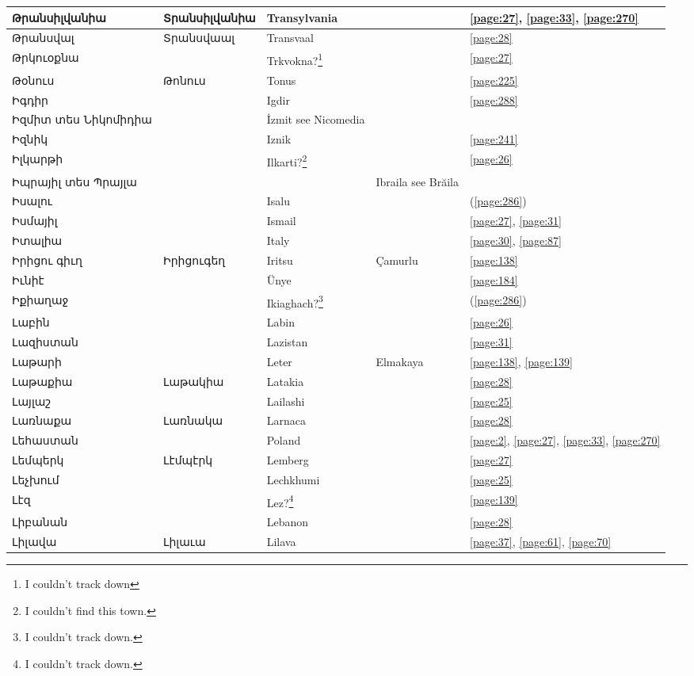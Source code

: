 \begin{center}
\begin{longtable}{|p{}|p{3cm}|p{3cm}|p{2cm}|p{3cm}|}
Թրանսիլվանիա&Տրանսիլվանիա
&Transylvania & &\ref{page:27}, \ref{page:33}, \ref{page:270}\\ \hline
Թրանսվալ&Տրանսվաալ & Transvaal& &\ref{page:28}\\ \hline
Թրկուօքնա& &Trkvokna?\footnote{I couldn't track down}& &\ref{page:27}\\ \hline
Թօնուս& Թոնուս& Tonus& &\ref{page:225}\\ \hline
Իգդիր& & Igdir& &\ref{page:288}\\ \hline
Իզմիտ տես Նիկոմիդիա& &İzmit see Nicomedia & &\\ \hline
Իզնիկ& & Iznik& &\ref{page:241}\\ \hline
Իլկարթի& &Ilkarti?\footnote{I couldn't find this town.} & &\ref{page:26}\\ \hline
Իպրայիլ տես Պրայլա& & &Ibraila see Brăila &\\ \hline
Իսալու& & Isalu& &(\ref{page:286})\\ \hline
Իսմայիլ& & Ismail& &\ref{page:27}, \ref{page:31}\\ \hline
Իտալիա& &Italy & &\ref{page:30}, \ref{page:87}\\ \hline
Իրիցու գիւղ& Իրիցուգեղ&Iritsu &Çamurlu &\ref{page:138}\\ \hline
Իւնիէ& & Ünye& &\ref{page:184}\\ \hline
Իքիաղաջ& &Ikiaghach?\footnote{I couldn't track down.} & &(\ref{page:286})\\ \hline
Լաբին& & Labin& &\ref{page:26}\\ \hline
Լազիստան& &Lazistan & &\ref{page:31}\\ \hline
Լաթարի& & Leter &Elmakaya &\ref{page:138}, \ref{page:139}\\ \hline
Լաթաքիա&   Լաթակիա & Latakia& &\ref{page:28}\\ \hline
Լայլաշ& & Lailashi& &\ref{page:25}\\ \hline
Լառնաքա& Լառնակա& Larnaca& &\ref{page:28}\\ \hline
Լեհաստան& &Poland & &\ref{page:2}, \ref{page:27}, \ref{page:33}, \ref{page:270}\\ \hline
Լեմպերկ& Լէմպէրկ& Lemberg& &\ref{page:27}\\ \hline
Լեչխում& &Lechkhumi & &\ref{page:25}\\ \hline
Լէզ& & Lez?\footnote{I couldn't track down.}& &\ref{page:139}\\ \hline
Լիբանան& &Lebanon & &\ref{page:28}\\ \hline
Լիլավա&Լիլաւա &Lilava & &\ref{page:37}, \ref{page:61}, \ref{page:70}\\ \hline

\end{longtable}
\end{center}
